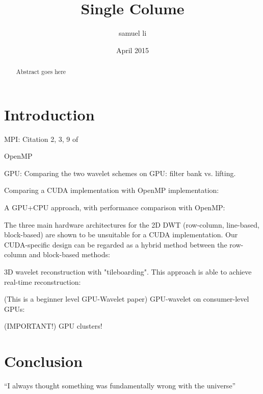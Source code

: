 \documentclass{article}
\title{Single Colume}
\author{samuel li}
\date{April 2015}
\begin{document}
\maketitle

\begin{abstract}
Abstract goes here
\end{abstract}

\section{Introduction}
MPI:
Citation 2, 3, 9 of \cite{lucka2000parallel}
\cite{chadha2002scalable}

OpenMP
\cite{lucka2000parallel}


GPU:
Comparing the two wavelet schemes on GPU:
filter bank vs. lifting. \cite{tenllado2008parallel}

Comparing a CUDA implementation with OpenMP implementation:
\cite{franco2009parallel}

A GPU+CPU approach, with performance comparison with OpenMP:
\cite{franco2010parallel}

The three main hardware architectures for the 2D DWT (row-column, line-based, block-based) are shown to be unsuitable for a CUDA implementation. Our CUDA-specific design can be regarded as a hybrid method between the row-column and block-based methods:
\cite{van2011accelerating}

3D wavelet reconstruction with "tileboarding". This approach is able
to achieve real-time reconstruction:
\cite{garcia2005gpu}

(This is a beginner level GPU-Wavelet paper)
GPU-wavelet on consumer-level GPUs:
\cite{wong2007discrete}

(IMPORTANT!)
GPU clusters! \cite{strengert2005large}

\section{Conclusion}
``I always thought something was fundamentally wrong with the universe'' 
\cite{lucka2000parallel}



\end{document}
